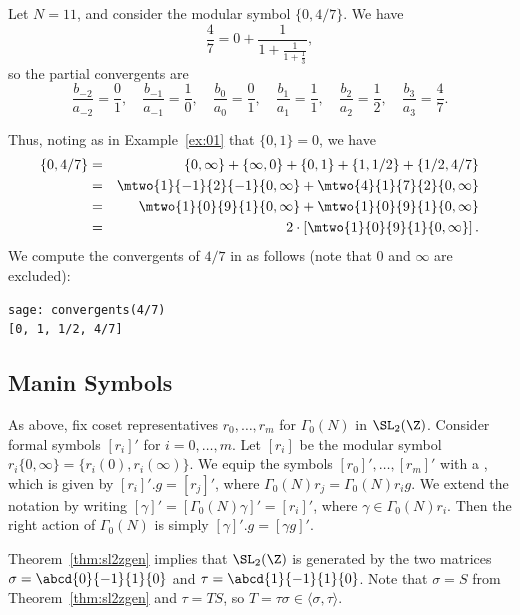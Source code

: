\begin{example}
Let $N=11$, and consider the modular symbol $\{0,4/7\}$. 
We have
$$\frac{4}{7} 
  = 0 + \frac{1}{1+\frac{1}{1+\frac{1}{3}}},$$
so the partial convergents are
$$\frac{b_{-2}}{a_{-2}} = \frac{0}{1},\quad
\frac{b_{-1}}{a_{-1}} = \frac{1}{0},\quad
\frac{b_0}{a_0} = \frac{0}{1},\quad
\frac{b_1}{a_1} = \frac{1}{1},\quad
\frac{b_2}{a_2} = \frac{1}{2},\quad
\frac{b_3}{a_3} = \frac{4}{7}.
$$

Thus, noting as in Example~\ref{ex:01} that $\{0,1\}=0$, we have
\begin{eqnarray*}
\{0,4/7\}
 &=& \{0,\infty\} +\{\infty,0\} + \{0,1\}+ \{1,1/2\} + \{1/2,4/7\}\\
 &=&
    \mtwo{1}{-1}{2}{-1}\{0,\infty\}
    + \mtwo{4}{1}{7}{2}\{0,\infty\}\\
 &=&
    \mtwo{1}{0}{9}{1}\{0,\infty\}
    + \mtwo{1}{0}{9}{1}\{0,\infty\}\\
 &=&
    2 \cdot \left[\mtwo{1}{0}{9}{1}\{0,\infty\}\right].
\end{eqnarray*}
We compute the convergents of $4/7$ in \sage{}
as follows (note that $0$ and $\infty$ are excluded):
\begin{verbatim}
sage: convergents(4/7)
[0, 1, 1/2, 4/7]
\end{verbatim}
\end{example}

\subsection{Manin Symbols}\label{sec:maninsyms}
As above, fix coset representatives $r_0,\ldots,r_m$ for $\Gamma_0(N)$
in $\SL_2(\Z)$.  Consider formal symbols $[r_i]'$ for $i=0,\ldots, m$.
Let $[r_i]$ be the modular symbol $r_i\{0,\infty\} = \{r_i(0),
r_i(\infty)\}$.  We equip
the symbols $[r_0]',\ldots,[r_m]'$ with a , which is given by $[r_i]'.g = [r_j]'$, where $\Gamma_0(N)
r_j = \Gamma_0(N) r_i g$.   We extend the notation by writing  $[\gamma]' = 
[\Gamma_0(N)\gamma]' = [r_i]'$, where $\gamma \in \Gamma_0(N) r_i$.
Then the right action of $\Gamma_0(N)$ is simply $[\gamma]'.g = [\gamma g]'$.

Theorem~\ref{thm:sl2zgen} implies that $\SL_2(\Z)$ 
is generated by the two matrices
$\sigma = \abcd{0}{-1}{1}{\hfill0}$ and 
$\tau=\abcd{1}{-1}{1}{\hfill0}$.
Note that $\sigma=S$ from Theorem~\ref{thm:sl2zgen} and 
$\tau = TS$, so $T = \tau\sigma \in \langle \sigma, \tau\rangle.$

